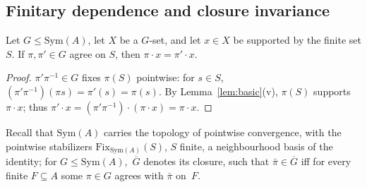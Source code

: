 \documentclass{lmcs}
\newcommand{\Sym}{\mathrm{Sym}}
\newcommand{\Fix}{\mathrm{Fix}}
\begin{document}
\subsection{Finitary dependence and closure invariance}

\begin{lem}\label{lem:dependence}
Let $G\leq\Sym(A)$, let $X$ be a $G$-set, and let $x\in X$ be
supported by the finite set $S$. If $\pi,\pi'\in G$ agree on $S$,
then $\pi\cdot x=\pi'\cdot x$.
\end{lem}

\begin{proof}
$\pi'\pi^{-1}\in G$ fixes $\pi(S)$ pointwise: for $s\in S$,
$(\pi'\pi^{-1})(\pi s)=\pi'(s)=\pi(s)$. By
Lemma~\ref{lem:basic}(v), $\pi(S)$ supports $\pi\cdot x$; thus
$\pi'\cdot x=(\pi'\pi^{-1})\cdot(\pi\cdot x)=\pi\cdot x$.
\end{proof}

Recall that $\Sym(A)$ carries the topology of pointwise convergence,
with the pointwise stabilizers $\Fix_{\Sym(A)}(S)$, $S$ finite, a
neighbourhood basis of the identity; for $G\leq\Sym(A)$,~$\overline G$ denotes its closure, such that $\bar\pi\in\overline G$ iff for every finite $F\subseteq A$ some $\pi\in G$ agrees with $\bar\pi$ on~$F$.
\end{document}
